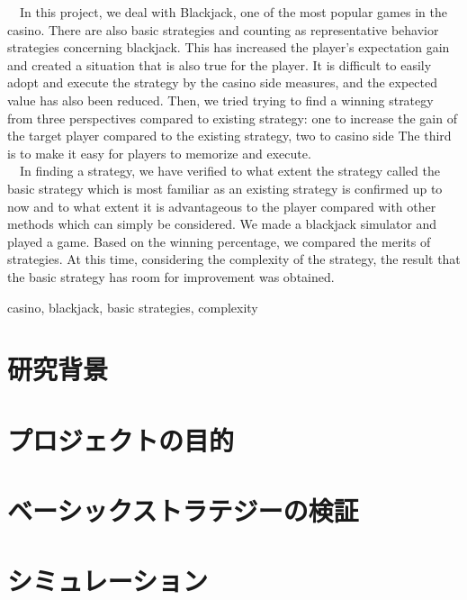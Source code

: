 \documentclass[11pt,a4paper,oneside]{jsbook}
\begin{document}
\begin{eabstract} 
\ \ In this project, we deal with Blackjack, one of the most popular games in the casino. There are
also basic strategies and counting as representative behavior strategies concerning blackjack. This
has increased the player's expectation gain and created a situation that is also true for the player.
 It is difficult to easily adopt and execute the strategy by the casino side measures, and the expected
  value has also been reduced. Then, we tried trying to find a winning strategy from three perspectives 
  compared to existing strategy: one to increase the gain of the target player compared to the existing 
  strategy, two to casino side The third is to make it easy for players to memorize and execute.\\
\ \ In finding a strategy, we have verified to what extent the strategy called the basic strategy which 
is most familiar as an existing strategy is confirmed up to now and to what extent it is advantageous to 
the player compared with other methods which can simply be considered. We made a blackjack simulator and 
played a game. Based on the winning percentage, we compared the merits of strategies. At this time, considering 
the complexity of the strategy, the result that the basic strategy has room for improvement was obtained.
\begin{ekeyword}
casino, blackjack, basic strategies, complexity
\end{ekeyword}
\end{eabstract}

\tableofcontents
\newpage


\chapter{研究背景}




\chapter{プロジェクトの目的}

\chapter{ベーシックストラテジーの検証}

\chapter{シミュレーション}


\end{document}
